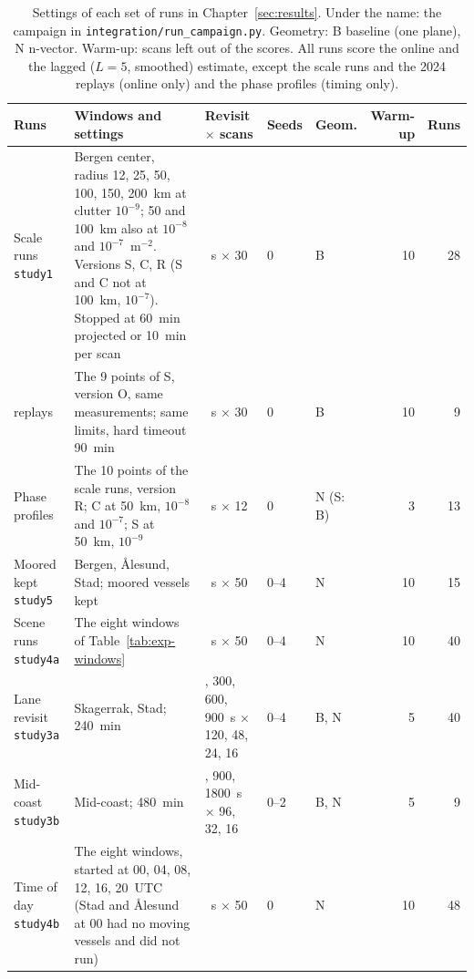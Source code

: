 \begin{table}[htbp]
\centering
\caption[Settings of each set of runs]{Settings of each set of runs in Chapter~\ref{sec:results}. Under the name: the campaign in \texttt{integration/run\_campaign.py}. Geometry: B baseline (one plane), N n-vector. Warm-up: scans left out of the scores. All runs score the online and the lagged ($L = 5$, smoothed) estimate, except the scale runs and the 2024 replays (online only) and the phase profiles (timing only).}
\label{tab:app-runs}
\footnotesize
\begin{tabularx}{\textwidth}{>{\raggedright\arraybackslash}p{2.1cm} X >{\raggedright\arraybackslash}p{2.0cm} l l r r}
\toprule
Runs & Windows and settings & Revisit $\times$ scans & Seeds & Geom. & Warm-up & Runs \\
\midrule
Scale runs \newline \texttt{study1} & Bergen center, radius 12, 25, 50, 100, 150, 200~km at clutter $10^{-9}$; 50 and 100~km also at $10^{-8}$ and $10^{-7}$~m$^{-2}$. Versions S, C, R (S and C not at 100~km, $10^{-7}$). Stopped at 60~min projected or 10~min per scan & 120~s $\times$ 30 & 0 & B & 10 & 28 \\
2024 replays & The 9 points of S, version O, same measurements; same limits, hard timeout 90~min & 120~s $\times$ 30 & 0 & B & 10 & 9 \\
Phase profiles & The 10 points of the scale runs, version R; C at 50~km, $10^{-8}$ and $10^{-7}$; S at 50~km, $10^{-9}$ & 120~s $\times$ 12 & 0 & N (S: B) & 3 & 13 \\
Moored kept \newline \texttt{study5} & Bergen, Ålesund, Stad; moored vessels kept & 120~s $\times$ 50 & 0--4 & N & 10 & 15 \\
Scene runs \newline \texttt{study4a} & The eight windows of Table~\ref{tab:exp-windows} & 120~s $\times$ 50 & 0--4 & N & 10 & 40 \\
Lane revisit \newline \texttt{study3a} & Skagerrak, Stad; 240~min & 120, 300, 600, 900~s $\times$ 120, 48, 24, 16 & 0--4 & B, N & 5 & 40 \\
Mid-coast \newline \texttt{study3b} & Mid-coast; 480~min & 300, 900, 1800~s $\times$ 96, 32, 16 & 0--2 & B, N & 5 & 9 \\
Time of day \newline \texttt{study4b} & The eight windows, started at 00, 04, 08, 12, 16, 20~UTC (Stad and Ålesund at 00 had no moving vessels and did not run) & 120~s $\times$ 50 & 0 & N & 10 & 48 \\
\bottomrule
\end{tabularx}
\end{table}

